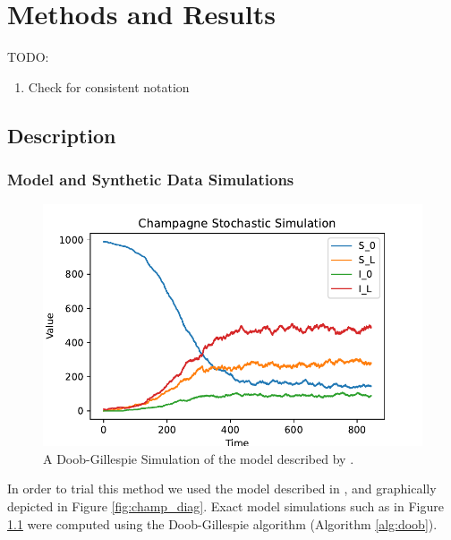 \chapter{Methods and Results}

TODO:\begin{enumerate}
    \item Check for consistent notation
\end{enumerate}

\section{Description}

\subsection*{Model and Synthetic Data Simulations}

\begin{figure}[htbp]
    \centering
    \includegraphics[width=\textwidth]{../champagne_GP_images/champagne_simulation.pdf}
    \caption{A Doob-Gillespie Simulation of the model described by \cite{champagne_using_2022}.}\label{fig:champ_doob}
\end{figure}

In order to trial this method we used the model described in
\cite{champagne_using_2022}, and graphically depicted in Figure
\ref{fig:champ_diag}. Exact model simulations such as in Figure
\ref{fig:champ_doob} were computed using the
Doob-Gillespie algorithm (Algorithm \ref{alg:doob}).

